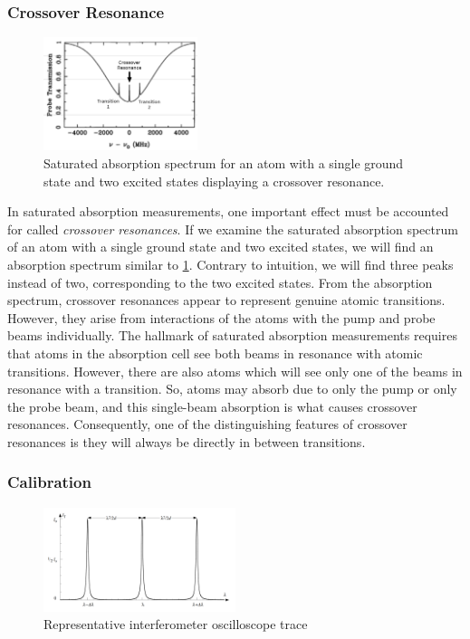 \documentclass[12pt]{article}
\begin{document}
	\subsubsection*{Crossover Resonance}
	\begin{figure}
		\includegraphics[width=0.4\textwidth]{Crossover/crossoverAnnotated.PNG}
		\caption{Saturated absorption spectrum for an atom with a single ground state and two excited states displaying a crossover resonance.}
		\label{crossover}
	\end{figure}
	
	In saturated absorption measurements, one important effect must be accounted for called \emph{crossover resonances}. If we examine the saturated absorption spectrum of an atom with a single ground state and two excited states, we will find an absorption spectrum similar to \cref{crossover}. Contrary to intuition, we will find three peaks instead of two, corresponding to the two excited states. From the absorption spectrum, crossover resonances appear to represent genuine atomic transitions. However, they arise from interactions of the atoms with the pump and probe beams individually. The hallmark of saturated absorption measurements requires that atoms in the absorption cell see both beams in resonance with atomic transitions. However, there are also atoms which will see only one of the beams in resonance with a transition. So, atoms may absorb due to only the pump or only the probe beam, and this single-beam absorption is what causes crossover resonances. Consequently, one of the distinguishing features of crossover resonances is they will always be directly in between transitions.
	
	\subsubsection*{Calibration}
	
	\begin{figure}
		\includegraphics[width=0.5\textwidth]{DiodeLaser/InterferometerScan.png}
		\caption{Representative interferometer oscilloscope trace}
		\label{interferometerScan}
	\end{figure}
\end{document}
